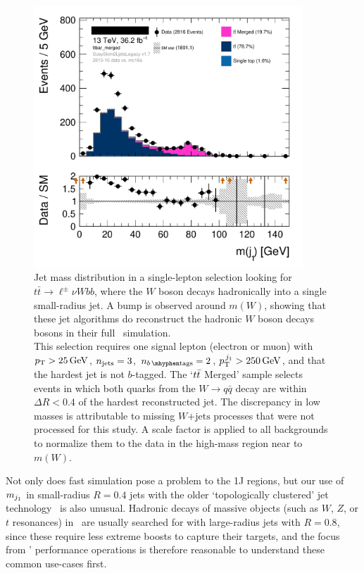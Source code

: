 \begin{figure}[tp]
\centering
\includegraphics[width=0.9\textwidth]{figures/2Ljets_hist1d_jetM0_ttbar_merged_tweak.png}
\caption[
Jet mass distribution in a single-lepton selection looking for
$t\bar t \to \ell^\pm\nu W(J) \bar bb$
]{%
Jet mass distribution in a single-lepton selection looking for
$t\bar t \to \ell^\pm\nu W bb$, where the $W$ boson decays hadronically
into a single small-radius jet.
A bump is observed around $m(W)$, showing that these jet algorithms do
reconstruct the hadronic $W$ boson decays bosons in their full \atlas\
simulation.
\\[0.5em]
This selection requires one signal lepton (electron or muon) with
$\pt > 25\,\eV[G]$, $\njet = 3$, $\nbtag = 2$, $\ptjone > 250\,\eV[G]$,
and that the hardest jet is not $b$-tagged.
The `$\ttbar$ Merged' sample selects events in which both quarks from the
$W\to q\bar q$ decay are within $\Delta R < 0.4$ of the hardest
reconstructed jet.
The discrepancy in low masses is attributable to missing $W\mathrm{+jets}$
processes that were not processed for this study.
A scale factor is applied to all backgrounds to normalize them to the data in
the high-mass region near to $m(W)$.
}
\label{fig:2ljets_jetm_ttbar_mw}
\end{figure}

Not only does fast simulation pose a problem to the 1J regions, but our use
of $\mjetone$ in small-radius $R=0.4$ jets with the older
`topologically clustered' jet technology~\cite{atlas_jet_topo_PERF_2014_07}
is also unusual.
Hadronic decays of massive objects
(such as $W$, $Z$, or $t$ resonances) in \atlas\ are usually searched for with
large-radius jets with $R=0.8$, since these require less extreme boosts to
capture their targets, and the focus from \atlas' performance operations is
therefore reasonable to understand these common use-cases first.

